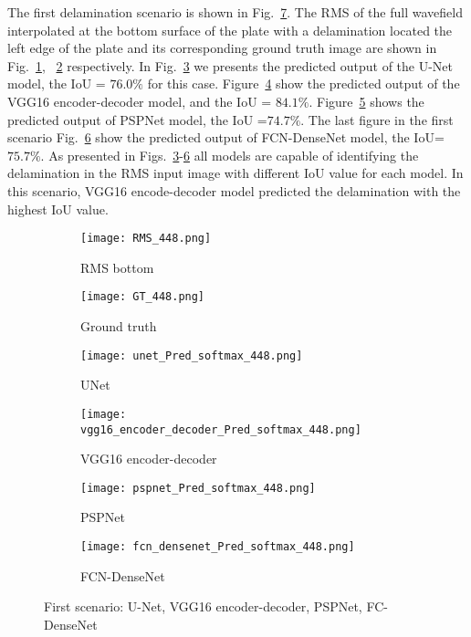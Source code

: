 The first delamination scenario is shown in Fig.~\ref{fig:softmax_448}. 
The RMS of the full wavefield interpolated at the bottom surface of the plate with a delamination located the left edge of the plate and its corresponding ground truth image are shown in Fig.~\ref{fig:RMS_flat_shell_Vz_448}, ~\ref{fig:m1_rand_single_delam_448} respectively. 
In Fig.~\ref{fig:unet_pred_448} we presents the predicted output of the U-Net model, the IoU = \(76.0\%\) for this case.
Figure~\ref{fig:vgg16_pred_448} show the predicted output of the VGG16 encoder-decoder model, and the IoU = \(84.1\%\). 
Figure~\ref{fig:pspnet_pred_448} shows the predicted output of PSPNet model, the IoU =\(74.7\%\).
The last figure in the first scenario Fig.~\ref{fig:fcn_densenet_pred_448}	show the predicted output of FCN-DenseNet model, the IoU=\(75.7\%\). 
As presented in Figs.~\ref{fig:unet_pred_448}-\ref{fig:fcn_densenet_pred_448} all models are capable of identifying the delamination in the RMS input image with different IoU value for each model. 
In this scenario, VGG16 encode-decoder model predicted the delamination with the highest IoU value.
\begin{figure} [!h]
	\centering
	\begin{subfigure}[b]{0.47\textwidth}
		\centering
		\texttt{[image: RMS\_448.png]}
		\caption{RMS bottom}
		\label{fig:RMS_flat_shell_Vz_448}
	\end{subfigure}
	\hfill
	\begin{subfigure}[b]{0.47\textwidth}
		\centering
		\texttt{[image: GT\_448.png]}
		\caption{Ground truth}
		\label{fig:m1_rand_single_delam_448}
	\end{subfigure}
	\begin{subfigure}[b]{0.47\textwidth}
		\centering
		\texttt{[image: unet\_Pred\_softmax\_448.png]}
		\caption{UNet}
		\label{fig:unet_pred_448}
	\end{subfigure}
	\hfill
	\begin{subfigure}[b]{0.47\textwidth}
		\centering
		\texttt{[image: vgg16\_encoder\_decoder\_Pred\_softmax\_448.png]}
		\caption{VGG16 encoder-decoder}
		\label{fig:vgg16_pred_448}
	\end{subfigure}
	\hfill
	\begin{subfigure}[b]{0.47\textwidth}
		\centering
		\texttt{[image: pspnet\_Pred\_softmax\_448.png]}
		\caption{PSPNet}
		\label{fig:pspnet_pred_448}
	\end{subfigure}
	\hfill
	\begin{subfigure}[b]{0.47\textwidth}
		\centering
		\texttt{[image: fcn\_densenet\_Pred\_softmax\_448.png]}
		\caption{FCN-DenseNet}
		\label{fig:fcn_densenet_pred_448}
	\end{subfigure}
	\caption{First scenario: U-Net, VGG16 encoder-decoder, PSPNet, FC-DenseNet}
	\label{fig:softmax_448}
\end{figure} 

